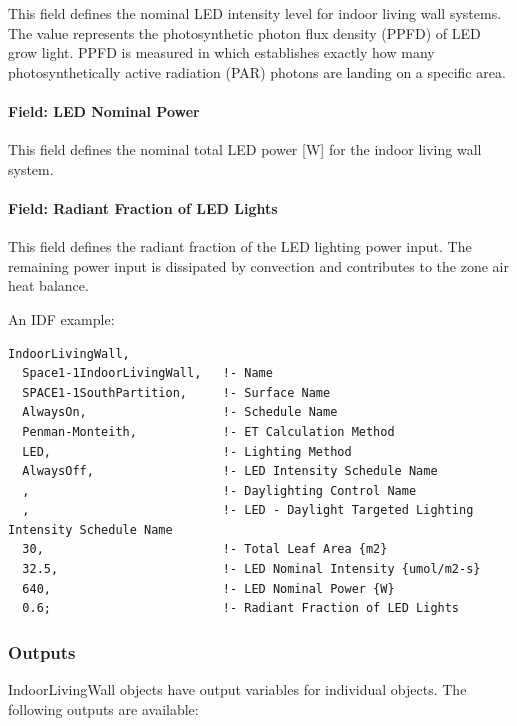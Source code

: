 This field defines the nominal LED intensity level for indoor living wall systems. The value represents the photosynthetic photon flux density (PPFD) of LED grow light. PPFD is measured in \si{\umolperAreaperSecond} which establishes exactly how many photosynthetically active radiation (PAR) photons are landing on a specific area.

\paragraph{Field: LED Nominal Power}\label{field-led-nominal-power-indoorlivingwall}

This field defines the nominal total LED power {[}\si{\watt}{]} for the indoor living wall system.

\paragraph{Field: Radiant Fraction of LED Lights}\label{field-radiant-fraction-of-led-lights-indoorlivingwall}

This field defines the radiant fraction of the LED lighting power input. The remaining power input is dissipated by convection and contributes to the zone air heat balance.

An IDF example:

\begin{lstlisting}
IndoorLivingWall,
  Space1-1IndoorLivingWall,   !- Name
  SPACE1-1SouthPartition,     !- Surface Name
  AlwaysOn,                   !- Schedule Name
  Penman-Monteith,            !- ET Calculation Method
  LED,                        !- Lighting Method
  AlwaysOff,                  !- LED Intensity Schedule Name
  ,                           !- Daylighting Control Name
  ,                           !- LED - Daylight Targeted Lighting Intensity Schedule Name
  30,                         !- Total Leaf Area {m2}
  32.5,                       !- LED Nominal Intensity {umol/m2-s}
  640,                        !- LED Nominal Power {W}
  0.6;                        !- Radiant Fraction of LED Lights
\end{lstlisting}

\subsubsection{Outputs}\label{outputs-indoorlivingwall}

IndoorLivingWall objects have output variables for individual objects. The following outputs are available:


